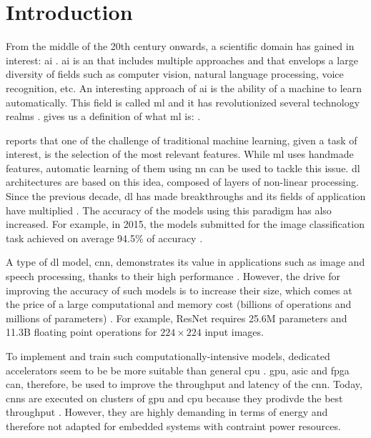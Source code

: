 \chapter*{Introduction} \label{chap:intr}
%
%
From the middle of the 20th century onwards, a scientific domain has gained in interest: \acrfull{ai} \cite{russell_artificial_2009}. \acrshort{ai} is an  that includes multiple approaches and that envelops a large diversity of fields such as computer vision, natural language processing, voice recognition, etc. An interesting approach of \acrshort{ai} is the ability of a machine to learn automatically. This field is called \acrfull{ml} and it has revolutionized several technology realms \cite{alom_history_2018}. \textcite{mitchell_machine_1997} gives us a definition of what \acrshort{ml} is: .

\textcite{arnold_introduction_2011} reports that one of the challenge of traditional machine learning, given a task of interest, is the selection of the most relevant features. While \acrshort{ml} uses handmade features, automatic learning of them using \acrfull{nn} can be used to tackle this issue. \acrfull{dl} architectures are based on this idea, composed of layers of non-linear processing. Since the previous decade, \acrshort{dl} has made breakthroughs and its fields of application have multiplied \cite{wason_deep_2018}. The accuracy of the models using this paradigm has also increased. For example, in 2015, the models submitted for the image classification task achieved on average 94.5\% of accuracy \cite{russakovsky_imagenet_2015}.

A type of \acrshort{dl} model, \acrfull{cnn}, demonstrates its value in applications such as image and speech processing, thanks to their high performance \cite{shawahna_fpga-based_2019}. However, the drive for improving the accuracy of such models is to increase their size, which comes at the price of a large computational and memory cost (billions of operations and millions of parameters) \cite{szegedy_going_2014, khan_survey_2020}. For example, ResNet \cite{he_deep_2015} requires 25.6M parameters and 11.3B floating point operations for $224 \times 224$ input images.

To implement and train such computationally-intensive models, dedicated accelerators seem to be be more suitable than general \acrfull{cpu} \cite{liu_fpga-based_2019}. \acrfull{gpu}, \acrfull{asic} and \acrfull{fpga} can, therefore, be used to improve the throughput and latency of the \acrshort{cnn}. Today, \acrshort{cnn}s are executed on clusters of \acrshort{gpu} and \acrshort{cpu} because they prodivde the best throughput \cite{liu_uniform_2019}. However, they are highly demanding in terms of energy and therefore not adapted for embedded systems with contraint power resources.

